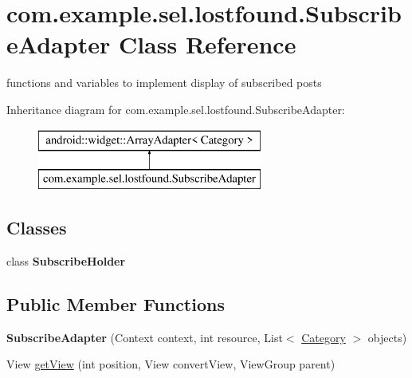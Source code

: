 \hypertarget{classcom_1_1example_1_1sel_1_1lostfound_1_1SubscribeAdapter}{}\section{com.\+example.\+sel.\+lostfound.\+Subscribe\+Adapter Class Reference}
\label{classcom_1_1example_1_1sel_1_1lostfound_1_1SubscribeAdapter}


functions and variables to implement display of subscribed posts  


Inheritance diagram for com.\+example.\+sel.\+lostfound.\+Subscribe\+Adapter\+:\begin{figure}[H]
\begin{center}
\leavevmode
\includegraphics[height=2.000000cm]{classcom_1_1example_1_1sel_1_1lostfound_1_1SubscribeAdapter}
\end{center}
\end{figure}
\subsection*{Classes}
\begin{DoxyCompactItemize}
\item 
class {\bfseries Subscribe\+Holder}
\end{DoxyCompactItemize}
\subsection*{Public Member Functions}
\begin{DoxyCompactItemize}
\item 
{\bfseries Subscribe\+Adapter} (Context context, int resource, List$<$ \hyperlink{classcom_1_1example_1_1sel_1_1lostfound_1_1Category}{Category} $>$ objects)\hypertarget{classcom_1_1example_1_1sel_1_1lostfound_1_1SubscribeAdapter_ad5670875fa5fcc236d9c794303f04369}{}\label{classcom_1_1example_1_1sel_1_1lostfound_1_1SubscribeAdapter_ad5670875fa5fcc236d9c794303f04369}

\item 
View \hyperlink{classcom_1_1example_1_1sel_1_1lostfound_1_1SubscribeAdapter_a942f195e46312808aff706a8a4e15e02}{get\+View} (int position, View convert\+View, View\+Group parent)
\end{DoxyCompactItemize}


